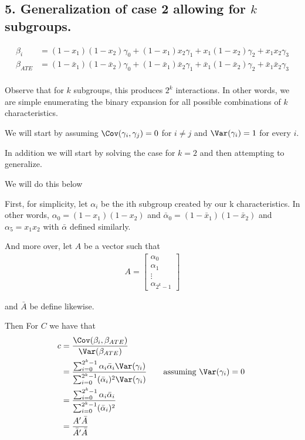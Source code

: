 \subsection*{5. Generalization of case 2 allowing for $k$ subgroups.}

\begin{align*}
	\beta_i &= (1-x_1)(1- x_2) \gamma_0 + (1-x_1) x_2 \gamma_1 +  x_1(1- x_2) \gamma_2 +  x_1 x_2 \gamma_3 \\
	\beta_{ATE} &= (1-\bar{x}_1)(1- \bar{x}_2) \gamma_0 + (1-\bar{x}_1) \bar{x}_2 \gamma_1 +  \bar{x}_1(1- \bar{x}_2) \gamma_2 +  \bar{x}_1 \bar{x}_2 \gamma_3 \\
\end{align*} 

Observe that for $k$ subgroups, this produces $2^{k}$ interactions. In other words, we are simple enumerating the binary expansion for all possible combinations of $k$ characteristics.


We will start by assuming $\Cov(\gamma_i, \gamma_j) = 0$ for $i \neq j$ and  $\Var(\gamma_i) = 1$ for every $i$.

In addition we will start by solving the case for $k = 2$ and then attempting to generalize.

We will do this below

First, for simplicity, let $ \alpha_i$ be the ith subgroup created by our k characteristics. In other words, $\alpha_0 = (1-x_1) (1 - x_2)$ and $\bar{\alpha}_0 = (1-\bar{x}_1)(1 - \bar{x}_2)$ and 
$\alpha_5 = x_1 x_2$ with $\bar{\alpha} $ defined similarly.

And more over, let $A$ be a vector such that
\begin{align*}
	A = \begin{bmatrix}
		\alpha_0 \\
		\alpha_1 \\
		\vdots \\
		\alpha_{2^{k}-1}
	\end{bmatrix}
\end{align*}

and $\bar{A}$ be define likewise.

Then For $C$ we have that
\begin{align*}
	c &= \frac{\Cov (\beta_i, \beta_{ATE})}{ \Var(\beta_{ATE})} \\
	  &= \frac{\sum_{i=0}^{2^{k}-1} \alpha_i \bar{\alpha}_i \Var(\gamma_i)}{\sum_{i=0}^{2^{k}-1} ( \bar{\alpha}_i)^2 \Var(\gamma_i)} \qquad \text{assuming $\Var(\gamma_i) = 0$ } \\
	  &= \frac{\sum_{i=0}^{2^{k}-1} \alpha_i \bar{\alpha}_i }{\sum_{i=0}^{2^{k}-1} ( \bar{\alpha}_i)^2 } \\ 
	  &= \frac{A' \bar{A}}{\bar{A}' \bar{A}} \\
\end{align*} 

